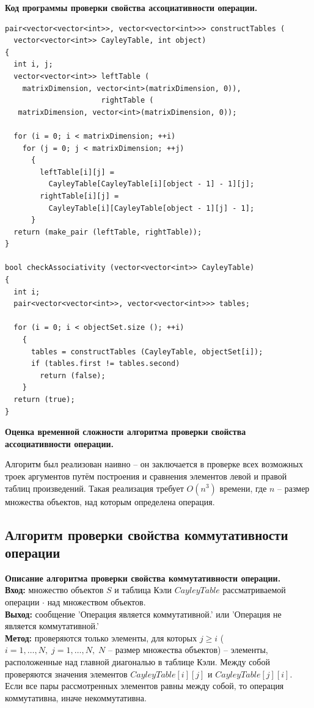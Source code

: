 \documentclass[spec, och, otchet, hidelinks]{SCWorks}
\newcommand{\tbf}[1]{\textbf{#1}}
\begin{document}
\par \tbf{Код программы проверки свойства ассоциативности операции.}
\begin{lstlisting}[caption=Код программы., mathescape]
pair<vector<vector<int>>, vector<vector<int>>> constructTables (
  vector<vector<int>> CayleyTable, int object)
{
  int i, j;
  vector<vector<int>> leftTable (
    matrixDimension, vector<int>(matrixDimension, 0)), 
                      rightTable (
   matrixDimension, vector<int>(matrixDimension, 0));

  for (i = 0; i < matrixDimension; ++i)
    for (j = 0; j < matrixDimension; ++j)
      {
        leftTable[i][j] = 
          CayleyTable[CayleyTable[i][object - 1] - 1][j];
        rightTable[i][j] = 
          CayleyTable[i][CayleyTable[object - 1][j] - 1];
      }
  return (make_pair (leftTable, rightTable));
}

bool checkAssociativity (vector<vector<int>> CayleyTable)
{
  int i;
  pair<vector<vector<int>>, vector<vector<int>>> tables;

  for (i = 0; i < objectSet.size (); ++i)
    {
      tables = constructTables (CayleyTable, objectSet[i]);
      if (tables.first != tables.second)
        return (false);
    }
  return (true);
}
\end{lstlisting}

\par \tbf{Оценка временной сложности алгоритма проверки свойства ассоциативности
  операции.}
\par Алгоритм был реализован наивно -- он заключается в проверке всех возможных
троек аргументов путём построения и сравнения элементов левой и правой таблиц
произведений. Такая реализация требует $O(n^3)$ времени, где $n$ -- размер
множества объектов, над которым определена операция. 

\newpage

\subsection{Алгоритм проверки свойства коммутативности операции}
\par \tbf{Описание алгоритма проверки свойства коммутативности операции.} \\
\tbf{Вход:} множество объектов $S$ и таблица Кэли $CayleyTable$ рассматриваемой операции
$\cdot$ над множеством объектов. \\
\tbf{Выход:} сообщение 'Операция является коммутативной.' или 'Операция не
является коммутативной.' \\
\tbf{Метод:} проверяются только элементы, для которых $j \geq  i$ ($i = 1,\dots,N,
\; j = 1,\dots,N, \; N$ -- размер множества объектов) -- элементы, расположенные
над главной диагональю в таблице Кэли. Между собой проверяются значения
элементов $CayleyTable[i][j]$ и $CayleyTable[j][i]$. Если все пары рассмотренных
элементов равны между собой, то операция коммутативна, иначе некоммутативна.
\end{document}
